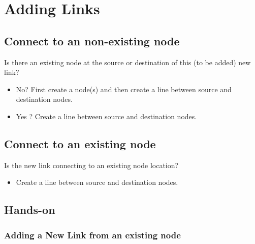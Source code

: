 \documentclass[
]{book}
\providecommand{\tightlist}{%
  \setlength{\itemsep}{0pt}\setlength{\parskip}{0pt}}
\begin{document}
\chapter{Adding Links}\label{adding-links}

\section{Connect to an non-existing node}\label{connect-to-an-non-existing-node}

Is there an existing node at the source or destination of this (to be added) new link?

\begin{itemize}
\tightlist
\item
  No? First create a node(s) and then create a line between source and destination nodes.
\item
  Yes ? Create a line between source and destination nodes.
\end{itemize}

\section{Connect to an existing node}\label{connect-to-an-existing-node}

Is the new link connecting to an existing node location?

\begin{itemize}
\tightlist
\item
  Create a line between source and destination nodes.
\end{itemize}

\section{Hands-on}\label{hands-on}

\subsection{Adding a New Link from an existing node}\label{adding-a-new-link-from-an-existing-node}
\end{document}
